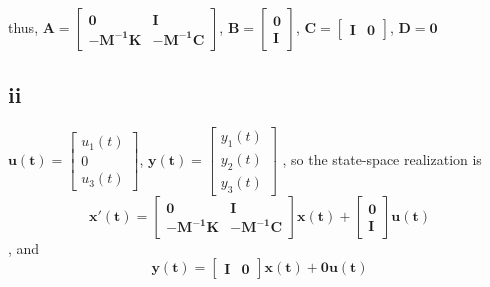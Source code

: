 \documentclass[12pt,a4paper]{article}
\begin{document}
thus, $\mathbf{A} = \begin{bmatrix}
    \mathbf{0} & \mathbf{I}\\
    \mathbf{-\mathbf{M}^{-1}\mathbf{K}} & \mathbf{-\mathbf{M}^{-1}\mathbf{\mathbf{C}}}
\end{bmatrix}$, $\mathbf{B} = \begin{bmatrix}
    \mathbf{0}\\
    \mathbf{I}
\end{bmatrix}$, $\mathbf{\mathbf{C}}=\begin{bmatrix}
    \mathbf{I} & \mathbf{0}
\end{bmatrix}$, $\mathbf{D}=\mathbf{0}$

\subsection*{ii}
$\mathbf{u(t)} = \begin{bmatrix}
    u_1(t)\\
    0 \\
    u_3(t)
\end{bmatrix}
$, $\mathbf{y(t)} = \begin{bmatrix}
    y_1(t)\\
    y_2(t)\\
    y_3(t)
\end{bmatrix}$
, so the state-space realization is
\[
    \mathbf{x'(t)} = \begin{bmatrix}
        \mathbf{0} & \mathbf{I}\\
        \mathbf{-\mathbf{M}^{-1}\mathbf{K}} & \mathbf{-\mathbf{M}^{-1}\mathbf{\mathbf{C}}}
    \end{bmatrix}
    \mathbf{x(t)}+ \begin{bmatrix}
        \mathbf{0}\\
        \mathbf{I}
    \end{bmatrix}\mathbf{u(t)}
\]
, and
\[
    \mathbf{y(t)} = \begin{bmatrix}
        \mathbf{I} & \mathbf{0}
    \end{bmatrix}
    \mathbf{x(t)} + 
        \mathbf{0}\mathbf{u(t)}
\]
\end{document}
